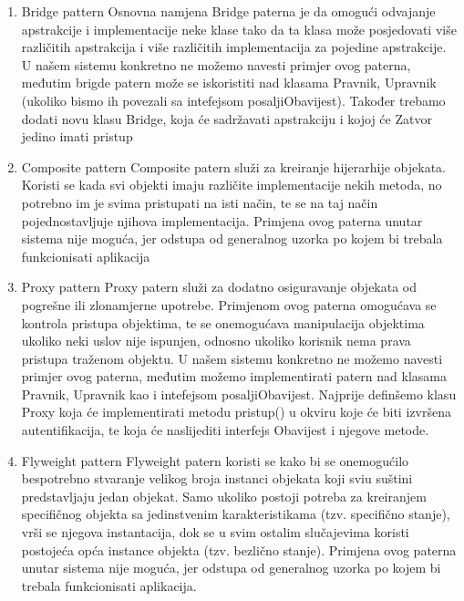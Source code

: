 \documentclass[12pt, a4paper]{report}
\theoremstyle{definition}
\begin{document}
\begin{enumerate}
    \item \large Bridge pattern \newline
  \normalsize
  Osnovna namjena Bridge paterna je da omogući odvajanje apstrakcije i implementacije neke klase  tako  da  ta  klasa  može  posjedovati  više  različitih  apstrakcija  i  više  različitih implementacija  za  pojedine  apstrakcije.  U  našem  sistemu  konkretno  ne  možemo  navesti primjer  ovog  paterna,  međutim  brigde  patern  može  se  iskoristiti  nad  klasama Pravnik, Upravnik (ukoliko bismo ih povezali sa intefejsom posaljiObavijest). Također trebamo dodati novu klasu Bridge, koja će sadržavati apstrakciju i kojoj će Zatvor jedino imati pristup
     \item \large Composite pattern \newline
  \normalsize
  Composite patern služi za kreiranje hijerarhije objekata. Koristi se kada svi objekti imaju različite implementacije nekih metoda, no potrebno im je svima pristupati na isti način, te se na taj način pojednostavljuje njihova implementacija. Primjena  ovog  paterna  unutar  sistema nije moguća, jer odstupa od generalnog uzorka po kojem bi trebala funkcionisati aplikacija
     \item \large Proxy pattern \newline
  \normalsize
  Proxy patern služi za dodatno osiguravanje objekata od pogrešne ili zlonamjerne upotrebe. Primjenom  ovog  paterna  omogućava  se  kontrola  pristupa  objektima,  te  se  onemogućava manipulacija objektima ukoliko neki uslov nije ispunjen, odnosno ukoliko korisnik nema prava pristupa traženom objektu. U našem sistemu konkretno ne možemo navesti primjer ovog paterna,  međutim  možemo  implementirati  patern  nad  klasama Pravnik, Upravnik kao  i intefejsom posaljiObavijest.  Najprije definšemo klasu Proxy koja će implementirati metodu pristup() u okviru koje će biti izvršena autentifikacija, te koja će naslijediti interfejs Obavijest i njegove metode. 
   \item \large Flyweight pattern \newline
  \normalsize
  Flyweight patern  koristi  se  kako  bi  se  onemogućilo  bespotrebno  stvaranje  velikog  broja instanci objekata koji sviu suštini predstavljaju jedan objekat. Samo ukoliko postoji potreba za kreiranjem specifičnog objekta sa jedinstvenim karakteristikama (tzv. specifično stanje), vrši se njegova instantacija, dok se u svim ostalim slučajevima koristi postojeća opća instance objekta (tzv. bezlično stanje). Primjena ovog paterna unutar sistema nije moguća, jer odstupa od generalnog uzorka po kojem bi trebala funkcionisati aplikacija.
\end{enumerate}
\end{document}
